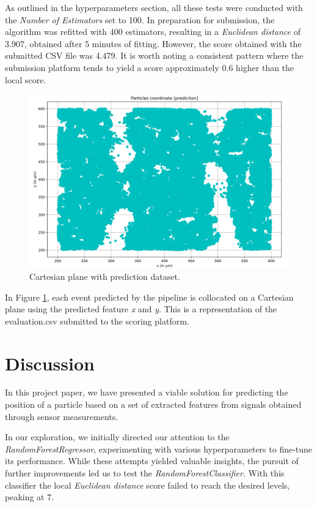 \documentclass[conference]{IEEEtran}
\begin{document}
As outlined in the hyperparameters section, all these tests were conducted with 
the \textit{Number of Estimators} set to 100. In preparation for submission, the algorithm 
was refitted with 400 estimators, resulting in a \textit{Euclidean distance} 
of 3.907, obtained after 5 minutes of fitting. 
However, the score obtained with the submitted CSV file was 4.479. 
It is worth noting a consistent pattern where the submission platform tends to yield a 
score approximately 0.6 higher than the local score.

\begin{figure}[htbp]
\centerline{\includegraphics[width=\linewidth]{media/plot_prediction.png}}
\caption{Cartesian plane with prediction dataset.}
\label{fig:cartesian_plane_prediction}
\end{figure}

In Figure \ref{fig:cartesian_plane_prediction}, each event predicted by the pipeline
is collocated on a Cartesian plane using the predicted feature \textit{x} and \textit{y}.
This is a representation of the evaluation.csv submitted to the scoring platform.


\section{Discussion}
In this project paper, we have presented a viable solution for predicting the 
position of a particle based on a set of extracted features from signals obtained 
through sensor measurements.

In our exploration, we initially directed our attention to the \textit{RandomForestRegressor}, 
experimenting with various hyperparameters to fine-tune its performance. 
While these attempts yielded valuable insights, the pursuit of further improvements 
led us to test the \textit{RandomForestClassifier}. With this classifier the 
local \textit{Euclidean distance} score failed to reach the desired levels, peaking at 7.
\end{document}

